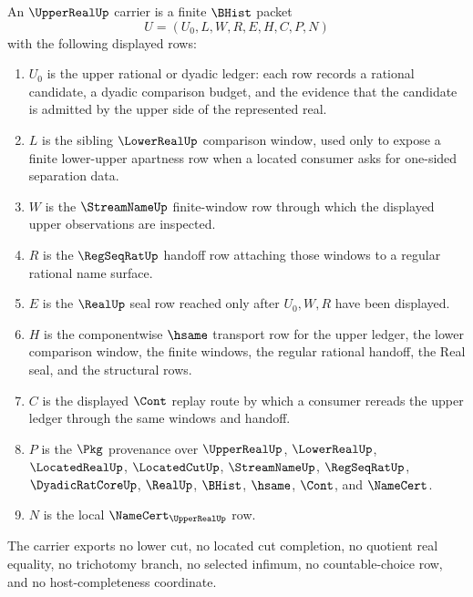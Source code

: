 \begin{definition}
\label{def:upper-real-carrier}
An $\UpperRealUp$ carrier is a finite $\BHist$ packet
$$
U=(U_0,L,W,R,E,H,C,P,N)
$$
with the following displayed rows:
\begin{enumerate}
\item $U_0$ is the upper rational or dyadic ledger: each row records a rational candidate, a dyadic comparison budget, and the evidence that the candidate is admitted by the upper side of the represented real.
\item $L$ is the sibling $\LowerRealUp$ comparison window, used only to expose a finite lower-upper apartness row when a located consumer asks for one-sided separation data.
\item $W$ is the $\StreamNameUp$ finite-window row through which the displayed upper observations are inspected.
\item $R$ is the $\RegSeqRatUp$ handoff row attaching those windows to a regular rational name surface.
\item $E$ is the $\RealUp$ seal row reached only after $U_0,W,R$ have been displayed.
\item $H$ is the componentwise $\hsame$ transport row for the upper ledger, the lower comparison window, the finite windows, the regular rational handoff, the Real seal, and the structural rows.
\item $C$ is the displayed $\Cont$ replay route by which a consumer rereads the upper ledger through the same windows and handoff.
\item $P$ is the $\Pkg$ provenance over $\UpperRealUp$, $\LowerRealUp$, $\LocatedRealUp$, $\LocatedCutUp$, $\StreamNameUp$, $\RegSeqRatUp$, $\DyadicRatCoreUp$, $\RealUp$, $\BHist$, $\hsame$, $\Cont$, and $\NameCert$.
\item $N$ is the local $\NameCert_{\UpperRealUp}$ row.
\end{enumerate}
The carrier exports no lower cut, no located cut completion, no quotient real equality, no trichotomy branch, no selected infimum, no countable-choice row, and no host-completeness coordinate.
\end{definition}

